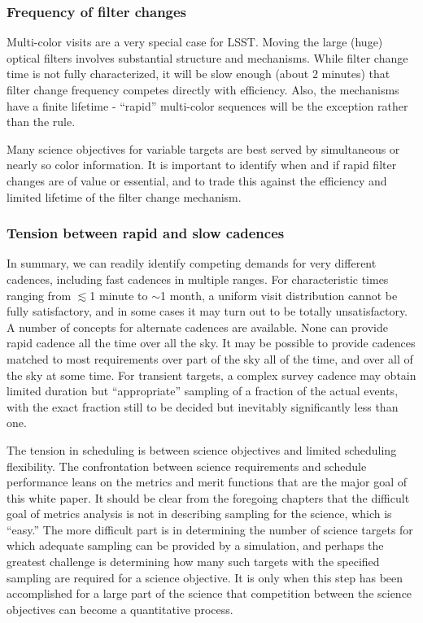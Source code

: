 \subsubsection{Frequency of filter changes}

Multi-color visits are a very special case for LSST.  Moving the large
(huge) optical filters involves substantial structure and mechanisms.
While filter change time is not fully characterized, it will be slow
enough (about 2 minutes) that filter change frequency competes directly
with efficiency. Also, the mechanisms have a finite lifetime - ``rapid''
multi-color sequences will be the exception rather than the rule.

Many science objectives for variable targets are best served by
simultaneous or nearly so color information.   It is important to identify
when and if rapid filter changes are of value or essential, and to trade this
against the efficiency and limited lifetime of the filter change mechanism.


\subsubsection{Tension between rapid and slow cadences}

In summary, we can readily identify competing demands for very different
cadences, including fast cadences in multiple ranges. For characteristic
times ranging from  $\lesssim$1 minute to $\sim$1 month, a uniform visit
distribution cannot be fully satisfactory, and in some cases it may turn
out to be totally unsatisfactory.  A number of concepts for alternate
cadences are available.  None can provide rapid cadence all the time
over all the sky. It may be possible to provide cadences matched to most
requirements over part of the sky all of the time, and over all of the
sky at some time. For transient targets, a complex survey cadence may
obtain limited duration but ``appropriate'' sampling of a fraction of
the actual events, with the exact fraction still to be decided but
inevitably significantly less than one.

The tension in scheduling is between science objectives and limited
scheduling flexibility. The confrontation between science requirements
and schedule performance leans on the metrics and merit functions that
are the major goal of this white paper.  It should be clear from the
foregoing chapters that the difficult goal of metrics analysis is not in
describing sampling for the science, which is ``easy.''  The more
difficult part is in determining the number of science targets for which
adequate sampling can be provided by a simulation, and perhaps the
greatest challenge is determining how many such targets with the
specified sampling are required for a science objective.  It is only
when this step has been accomplished for a large part of the science
that competition between the science objectives can become a
quantitative process.

